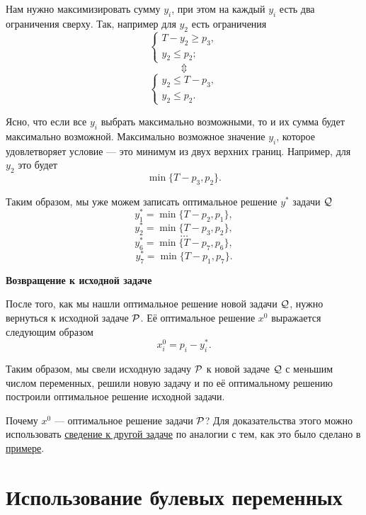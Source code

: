 Нам нужно максимизировать сумму $y_i$, при этом на каждый $y_i$ есть два ограничения сверху. Так, например для $y_2$ есть ограничения
\[
	\begin{cases}
		T - y_2 \ge p_3, \\
		y_2 \le p_2;
	\end{cases}
\]
\[
\Updownarrow
\]
\[
\begin{cases}
	y_2 \le T - p_3, \\
	y_2 \le p_2.
\end{cases}
\]

Ясно, что если все $y_i$ выбрать максимально возможными, то и их сумма будет максимально возможной. Максимально возможное значение $y_i$, которое удовлетворяет условие --- это минимум из двух верхних границ. Например, для $y_2$ это будет
\[
	\min\{T - p_3, p_2\}.
\]

Таким образом, мы уже можем записать оптимальное решение $y^*$ задачи $\Q$
\[
y_1^* = \min\{T - p_2, p_1\},
\]
\[
y_2^* = \min\{T - p_3, p_2\},
\]
\[
\dots
\]
\[
y_6^* = \min\{T - p_7, p_6\},
\]
\[
y_7^* = \min\{T - p_1, p_7\}.
\]

\textbf{Возвращение к исходной задаче}

После того, как мы нашли оптимальное решение новой задачи $\Q$, нужно вернуться к исходной задаче $\P$. Её оптимальное решение $x^0$ выражается следующим образом
\[
x_i^0 = p_i - y_i^*.
\]

Таким образом, мы свели исходную задачу $\P$ к новой задаче $\Q$ с меньшим числом переменных, решили новую задачу и по её оптимальному решению построили оптимальное решение исходной задачи.

Почему $x^0$ --- оптимальное решение задачи $\P$? Для доказательства этого можно использовать \hyperref[fact:reduction_to_other_problem]{сведение к другой задаче} по аналогии с тем, как это было сделано в \hyperref[ex:reduction_to_other_problem]{примере}.

\section{Использование булевых переменных}



